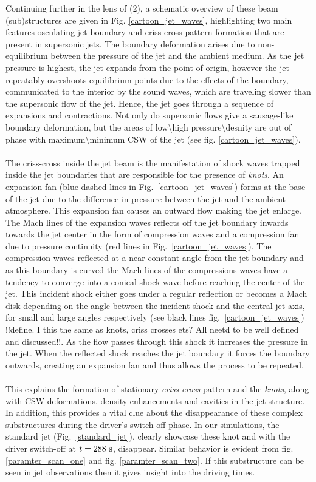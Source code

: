 \documentclass[12pt]{ociamthesis}
\newcommand{\fref}[1]{fig. \ref{#1}}
\newcommand{\np}{\\ \\}
\begin{document}
Continuing further in the lens of (2), a schematic overview of these beam (sub)structures are given in Fig. \ref{cartoon_jet_waves}, highlighting two main features osculating jet boundary and criss-cross pattern formation that are present in supersonic jets. The boundary deformation arises due to non-equilibrium between the pressure of the jet and the ambient medium. As the jet pressure is highest, the jet expands from the point of origin, however the jet repeatably overshoots equilibrium points due to the effects of the boundary, communicated to the interior by the sound waves, which are traveling slower than the supersonic flow of the jet. Hence, the jet goes through a sequence of expansions and contractions. Not only do supersonic flows give a sausage-like boundary deformation, but the areas of low\textbackslash high pressure\textbackslash desnity are out of phase with maximum\textbackslash minimum CSW of the jet (see fig. \ref{cartoon_jet_waves}). \np  
%
The criss-cross inside the jet beam is the manifestation of shock waves trapped inside the jet boundaries that are responsible for the presence of \textit{knots}. An expansion fan (blue dashed lines in Fig.~\ref{cartoon_jet_waves}) forms at the base of the jet due to the difference in pressure between the jet and the ambient atmosphere. This expansion fan causes an outward flow making the jet enlarge. The Mach lines of the expansion waves reflects off the jet boundary inwards towards the jet center in the form of compression waves and a compression fan due to pressure continuity (red lines in Fig.~\ref{cartoon_jet_waves}). The compression waves reflected at a near constant angle from the jet boundary and as this boundary is curved the Mach lines of the compressions waves have a tendency to converge into a conical shock wave before reaching the center of the jet. This incident shock either goes under a regular reflection or becomes a Mach disk depending on the angle between the incident shock and the central jet axis, for small and large angles respectively (see black lines fig.~\ref{cartoon_jet_waves}) {\color{green}!!define. I this the same as knots, criss crosses ets? All neetd to be well defined and discussed!!}. As the flow passes through this shock it increases the pressure in the jet. When the reflected shock reaches the jet boundary it forces the boundary outwards, creating an expansion fan and thus allows the process to be repeated. \np
%
This explains the formation of stationary \textit{criss-cross} pattern and the \textit{knots}, along with CSW deformations, density enhancements and cavities in the jet structure. In addition, this provides a vital clue about the disappearance of these complex substructures during the driver’s switch-off phase. In our simulations, the standard jet (Fig.~\ref{standard_jet}), clearly showcase these knot and with the driver switch-off at $t=288~\rm{s}$, disappear. Similar behavior is evident from \fref{paramter_scan_one} and \fref{paramter_scan_two}. If this substructure can be seen in jet observations then it gives insight into the driving times. 
\end{document}
